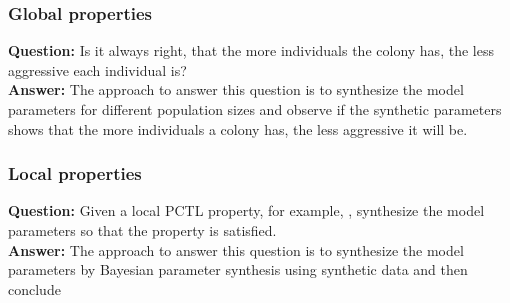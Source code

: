 \documentclass{beamer}
\begin{document}
\begin{frame}
  \frametitle{Global properties}
  \textbf{Question:} Is it always right, that the more individuals the colony
  has, the less aggressive each individual is?\\
  \textbf{Answer:} The approach to answer this question is to synthesize the
  model parameters for different population sizes and observe if the synthetic
  parameters shows that the more individuals a colony has, the less aggressive
  it will be.
\end{frame}

\begin{frame}
  \frametitle{Local properties}
  \textbf{Question:} Given a local PCTL property, for example, , synthesize the
  model
  parameters so that the property is satisfied. \\
  \textbf{Answer:} The approach to answer this question is to synthesize the
  model parameters by Bayesian parameter synthesis using synthetic data and then
  conclude
\end{frame}
\end{document}
